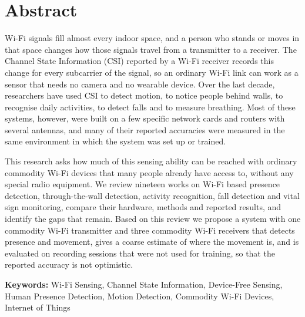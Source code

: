 \chapter*{Abstract}
Wi-Fi signals fill almost every indoor space, and a person who stands or moves in that space changes how those signals travel from a transmitter to a receiver. The Channel State Information (CSI) reported by a Wi-Fi receiver records this change for every subcarrier of the signal, so an ordinary Wi-Fi link can work as a sensor that needs no camera and no wearable device. Over the last decade, researchers have used CSI to detect motion, to notice people behind walls, to recognise daily activities, to detect falls and to measure breathing. Most of these systems, however, were built on a few specific network cards and routers with several antennas, and many of their reported accuracies were measured in the same environment in which the system was set up or trained.

This research asks how much of this sensing ability can be reached with ordinary commodity Wi-Fi devices that many people already have access to, without any special radio equipment. We review nineteen works on Wi-Fi based presence detection, through-the-wall detection, activity recognition, fall detection and vital sign monitoring, compare their hardware, methods and reported results, and identify the gaps that remain. Based on this review we propose a system with one commodity Wi-Fi transmitter and three commodity Wi-Fi receivers that detects presence and movement, gives a coarse estimate of where the movement is, and is evaluated on recording sessions that were not used for training, so that the reported accuracy is not optimistic.

\vspace{0.5cm}
\noindent\textbf{Keywords:} Wi-Fi Sensing, Channel State Information, Device-Free Sensing, Human Presence Detection, Motion Detection, Commodity Wi-Fi Devices, Internet of Things
